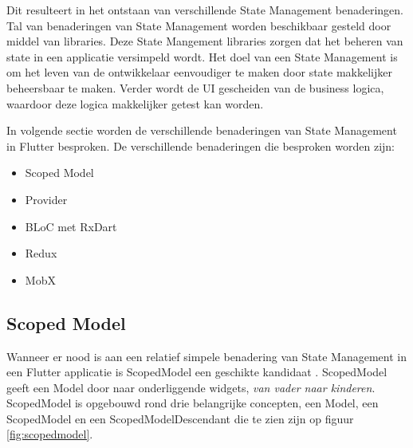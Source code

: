 Dit resulteert in het ontstaan van verschillende State Management benaderingen. Tal van benaderingen van State Management worden beschikbaar gesteld door middel van libraries. Deze State Mangement libraries zorgen dat het beheren van state in een applicatie versimpeld wordt.
Het doel van een State Management is om het leven van de ontwikkelaar eenvoudiger te
maken door state makkelijker beheersbaar te maken. Verder wordt de UI gescheiden van
de business logica, waardoor deze logica makkelijker getest kan worden.

In volgende sectie worden de verschillende benaderingen van State Management in Flutter besproken.
De verschillende benaderingen die besproken worden zijn: 
\begin{itemize}
    \item Scoped Model
    \item Provider
    \item BLoC met RxDart
    \item Redux
    \item MobX
\end{itemize}

\subsection{Scoped Model}
Wanneer er nood is aan een relatief simpele benadering van State Management in een Flutter applicatie is ScopedModel een geschikte kandidaat \autocite{Boelens2019}. ScopedModel geeft een Model door naar onderliggende widgets, \textit{van vader naar kinderen}. ScopedModel is opgebouwd rond drie belangrijke concepten, een Model, een ScopedModel en een ScopedModelDescendant die te zien zijn op figuur \ref{fig:scopedmodel}. 

